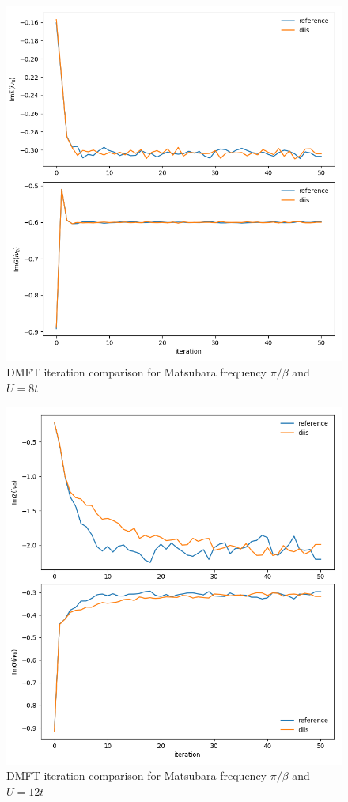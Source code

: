 \begin{figure}[H]
    \centering
    \includegraphics[width=1.0\textwidth]{figures/square_u08_b50_siw_imag_giw_imag.png}
    \caption{DMFT iteration comparison for Matsubara frequency $\pi/\beta$ and $U=8t$}
    \label{fig:eval-diis-u8}
\end{figure}

\begin{figure}[H]
    \centering
    \includegraphics[width=1.0\textwidth]{figures/square_u12_b50_siw_imag_giw_imag.png}
    \caption{DMFT iteration comparison for Matsubara frequency $\pi/\beta$ and $U=12t$}
    \label{fig:eval-diis-u12}
\end{figure}


